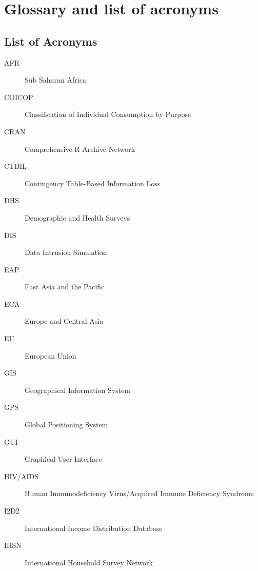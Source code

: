 \documentclass[letterpaper,10pt,english]{sphinxmanual}
\begin{document}
\chapter{Glossary and list of acronyms}
\label{\detokenize{glossary_acr:glossary-and-list-of-acronyms}}\label{\detokenize{glossary_acr::doc}}

\section{List of Acronyms}
\label{\detokenize{glossary_acr:list-of-acronyms}}\begin{description}
\item[{AFR}] \leavevmode
Sub Saharan Africa

\item[{COICOP}] \leavevmode
Classification of Individual Consumption by Purpose

\item[{CRAN}] \leavevmode
Comprehensive R Archive Network

\item[{CTBIL}] \leavevmode
Contingency Table-Based Information Loss

\item[{DHS}] \leavevmode
Demographic and Health Surveys

\item[{DIS}] \leavevmode
Data Intrusion Simulation

\item[{EAP}] \leavevmode
East Asia and the Pacific

\item[{ECA}] \leavevmode
Europe and Central Asia

\item[{EU}] \leavevmode
European Union

\item[{GIS}] \leavevmode
Geographical Information System

\item[{GPS}] \leavevmode
Global Positioning System

\item[{GUI}] \leavevmode
Graphical User Interface

\item[{HIV/AIDS}] \leavevmode
Human Immunodeficiency Virus/Acquired Immune Deficiency Syndrome

\item[{I2D2}] \leavevmode
International Income Distribution Database

\item[{IHSN}] \leavevmode
International Household Survey Network


\end{description}
\end{document}
